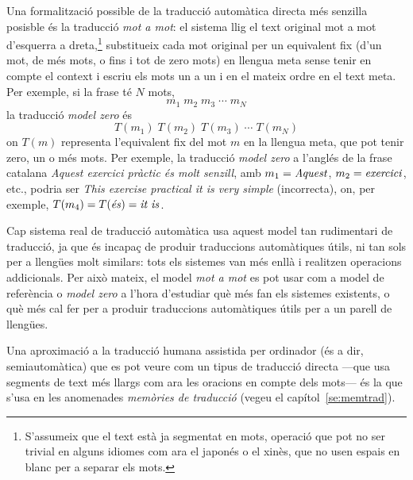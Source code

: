 Una formalització possible de la traducció automàtica directa més
senzilla posisble és la traducció \emph{mot a mot}: el sistema llig el
text original mot a mot d'esquerra a dreta,\footnote{S'assumeix que el
  text està ja segmentat en mots, operació que pot no ser trivial en
  alguns idiomes com ara el japonés o el xinès, que no usen espais en
  blanc per a separar els mots.} substitueix cada mot original per un
equivalent fix (d'un mot, de més mots, o fins i tot de zero mots) en
llengua meta sense tenir en compte el context i escriu els mots un a
un i en el mateix ordre en el text meta.  Per exemple, si la frase té \(N\) mots,
\begin{displaymath}
  m_1\; m_2\; m_3\; \cdots \;m_N
\end{displaymath}
la traducció \emph{model zero} és
\begin{displaymath}
  T(m_1)\; T(m_2)\; T(m_3)\; \cdots\; T(m_N)
\end{displaymath}
on \(T(m)\) representa l'equivalent fix del mot \(m\) en la llengua
meta, que pot tenir zero, un o més mots. Per exemple, la traducció
\emph{model zero} a l'anglés de la frase catalana \emph{Aquest
  exercici pràctic és molt senzill}, amb \(m_1=\mbox{\emph{Aquest}}\),
\(m_2=\mbox{\emph{exercici}}\), etc., podria ser \emph{This exercise
  practical it is very simple} (incorrecta), on, per exemple,
\(T(m_4)=T(\mbox{\emph{és}})=\mbox{\emph{it is}}\).

Cap sistema real de traducció automàtica usa aquest model tan
rudimentari de traducció, ja que és incapaç de produir traduccions
automàtiques útils, ni tan sols per a llengües molt similars: tots els
sistemes van més enllà i realitzen operacions addicionals. Per això
mateix, el model \emph{mot a mot} es pot usar com a model de
referència o \emph{model zero} a l'hora d'estudiar què més fan els
sistemes existents, o què més cal fer per a produir traduccions
automàtiques útils per a un parell de llengües.

Una aproximació a la traducció humana assistida per ordinador (és a
dir, semiautomàtica) que es pot veure com un tipus de traducció
directa ---que usa segments de text més llargs com ara les oracions en
compte dels mots--- és la que s'usa en les anomenades \emph{memòries
  de traducció} (vegeu el capítol~\ref{se:memtrad}).

